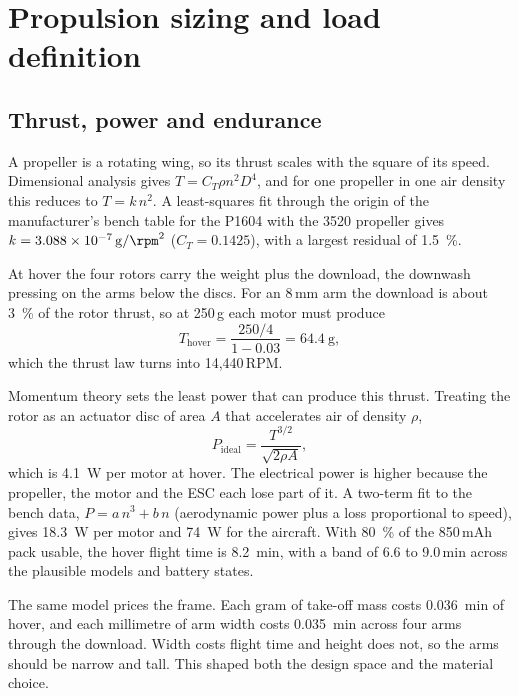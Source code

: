 \section{Propulsion sizing and load definition}\label{sec:sizing}

\subsection{Thrust, power and endurance}

A propeller is a rotating wing, so its thrust scales with the square of its speed. Dimensional analysis gives $T = C_T \rho n^2 D^4$, and for one propeller in one air density this reduces to $T = k\,n^2$. A least-squares fit through the origin of the manufacturer's bench table for the P1604 with the 3520 propeller gives $k = \SI{3.088e-7}{\gram/\rpm\squared}$ ($C_T = 0.1425$), with a largest residual of \SI{1.5}{\percent}.

At hover the four rotors carry the weight plus the download, the downwash pressing on the arms below the discs. For an 8\,mm arm the download is about \SI{3}{\percent} of the rotor thrust, so at 250\,g each motor must produce
\begin{equation}
T_\text{hover} = \frac{250/4}{1 - 0.03} = \SI{64.4}{\gram},
\end{equation}
which the thrust law turns into 14,440\,RPM.

Momentum theory sets the least power that can produce this thrust. Treating the rotor as an actuator disc of area $A$ that accelerates air of density $\rho$,
\begin{equation}
P_\text{ideal} = \frac{T^{3/2}}{\sqrt{2\rho A}},
\end{equation}
which is \SI{4.1}{\watt} per motor at hover. The electrical power is higher because the propeller, the motor and the ESC each lose part of it. A two-term fit to the bench data, $P = a\,n^3 + b\,n$ (aerodynamic power plus a loss proportional to speed), gives \SI{18.3}{\watt} per motor and \SI{74}{\watt} for the aircraft. With \SI{80}{\percent} of the 850\,mAh pack usable, the hover flight time is \SI{8.2}{min}, with a band of 6.6 to 9.0\,min across the plausible models and battery states.

The same model prices the frame. Each gram of take-off mass costs \SI{0.036}{min} of hover, and each millimetre of arm width costs \SI{0.035}{min} across four arms through the download. Width costs flight time and height does not, so the arms should be narrow and tall. This shaped both the design space and the material choice.

